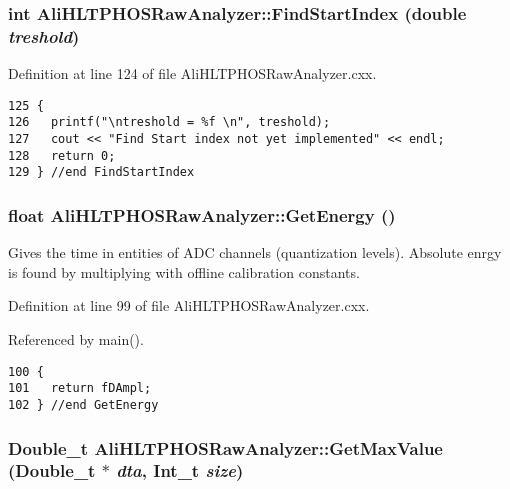 \subsubsection{\setlength{\rightskip}{0pt plus 5cm}int Ali\-HLTPHOSRaw\-Analyzer::Find\-Start\-Index (double {\em treshold})}\label{classAliHLTPHOSRawAnalyzer_AliHLTPHOSRawAnalyzerPeakFindera9}




Definition at line 124 of file Ali\-HLTPHOSRaw\-Analyzer.cxx.

\footnotesize\begin{verbatim}125 {
126   printf("\ntreshold = %f \n", treshold);
127   cout << "Find Start index not yet implemented" << endl;
128   return 0;
129 } //end FindStartIndex
\end{verbatim}\normalsize 


\subsubsection{\setlength{\rightskip}{0pt plus 5cm}float Ali\-HLTPHOSRaw\-Analyzer::Get\-Energy ()}\label{classAliHLTPHOSRawAnalyzer_AliHLTPHOSRawAnalyzerPeakFindera11}


Gives the time in entities of ADC channels (quantization levels). Absolute enrgy is found by multiplying with offline calibration constants. 

Definition at line 99 of file Ali\-HLTPHOSRaw\-Analyzer.cxx.

Referenced by main().

\footnotesize\begin{verbatim}100 {
101   return fDAmpl;
102 } //end GetEnergy
\end{verbatim}\normalsize 


\subsubsection{\setlength{\rightskip}{0pt plus 5cm}Double\_\-t Ali\-HLTPHOSRaw\-Analyzer::Get\-Max\-Value (Double\_\-t $\ast$ {\em dta}, Int\_\-t {\em size})}\label{classAliHLTPHOSRawAnalyzer_AliHLTPHOSRawAnalyzerPeakFindera18}




